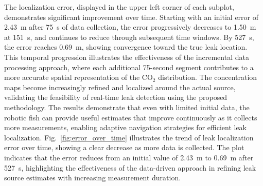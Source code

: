 \documentclass[12pt, draftclsnofoot, onecolumn]{IEEEtran}
\begin{document}
The localization error, displayed in the upper left corner of each subplot, demonstrates significant improvement over time. Starting with an initial error of 2.43~m after 75~s of data collection, the error progressively decreases to 1.50~m at 151~s, and continues to reduce through subsequent time windows. By 527~s, the error reaches 0.69~m, showing convergence toward the true leak location. This temporal progression illustrates the effectiveness of the incremental data processing approach, where each additional 75-second segment contributes to a more accurate spatial representation of the CO$_2$ distribution. The concentration maps become increasingly refined and localized around the actual source, validating the feasibility of real-time leak detection using the proposed methodology. The results demonstrate that even with limited initial data, the robotic fish can provide useful estimates that improve continuously as it collects more measurements, enabling adaptive navigation strategies for efficient leak localization. Fig.~\ref{fig:error_over_time} illustrates the trend of leak localization error over time, showing a clear decrease as more data is collected. The plot indicates that the error reduces from an initial value of 2.43~m to 0.69~m after 527~s, highlighting the effectiveness of the data-driven approach in refining leak source estimates with increasing measurement duration.
\end{document}

